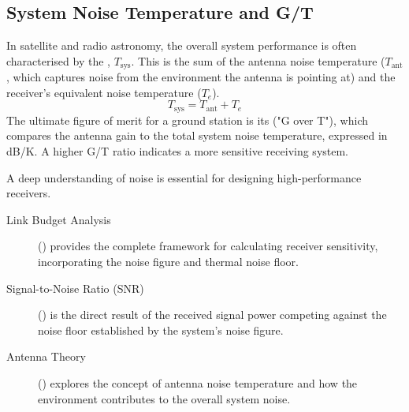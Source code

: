 \subsection{System Noise Temperature and G/T}

In satellite and radio astronomy, the overall system performance is often characterised by the , $T_{\text{sys}}$. This is the sum of the antenna noise temperature ($T_{\text{ant}}$, which captures noise from the environment the antenna is pointing at) and the receiver's equivalent noise temperature ($T_e$).
\begin{equation}
    T_{\text{sys}} = T_{\text{ant}} + T_e
\end{equation}
The ultimate figure of merit for a ground station is its  ("G over T"), which compares the antenna gain to the total system noise temperature, expressed in dB/K. A higher G/T ratio indicates a more sensitive receiving system.


\begin{importantbox}[title={Further Reading}]
    A deep understanding of noise is essential for designing high-performance receivers.
    \begin{description}
        \item[Link Budget Analysis] () provides the complete framework for calculating receiver sensitivity, incorporating the noise figure and thermal noise floor.
        \item[Signal-to-Noise Ratio (SNR)] () is the direct result of the received signal power competing against the noise floor established by the system's noise figure.
        \item[Antenna Theory] () explores the concept of antenna noise temperature and how the environment contributes to the overall system noise.
    \end{description}
\end{importantbox}
